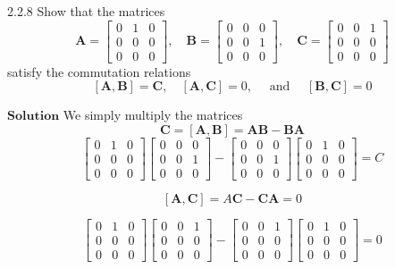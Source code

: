 \begin{mybox}{2.2.8}
Show that the matrices
$$\mathbf{A}=\begin{bmatrix}{0} & {1} & {0} \\ {0} & {0} & {0} \\ {0} & {0} & {0}\end{bmatrix}, \quad \mathbf{B}=\begin{bmatrix}{0} & {0} & {0} \\ {0} & {0} & {1} \\ {0} & {0} & {0}\end{bmatrix}, \quad \mathbf{C}=\begin{bmatrix}{0} & {0} & {1} \\ {0} & {0} & {0} \\ {0} & {0} & {0}\end{bmatrix}$$
satisfy the commutation relations
$$
[\mathbf{A}, \mathbf{B}]=\mathbf{C}, \quad[\mathbf{A}, \mathbf{C}]=0, \quad \text { and } \quad[\mathbf{B}, \mathbf{C}]=0
$$
\end{mybox}


$\boxed{\textbf{Solution}}$ We simply multiply the matrices
$$\mathbf{C}=[\mathbf{A}, \mathbf{B}] = \mathbf{\mathbf{AB}}- \mathbf{BA}$$
$$\begin{bmatrix}{0} & {1} & {0} \\ {0} & {0} & {0} \\ {0} & {0} & {0}\end{bmatrix} \begin{bmatrix}{0} & {0} & {0} \\ {0} & {0} & {1} \\ {0} & {0} & {0}\end{bmatrix} - \begin{bmatrix}{0} & {0} & {0} \\ {0} & {0} & {1} \\ {0} & {0} & {0}\end{bmatrix}\begin{bmatrix}{0} & {1} & {0} \\ {0} & {0} & {0} \\ {0} & {0} & {0}\end{bmatrix} = C$$

$$[\mathbf{A}, \mathbf{C}] = A\mathbf{C}-\mathbf{C}\mathbf{A} = 0$$

$$\begin{bmatrix}{0} & {1} & {0} \\ {0} & {0} & {0} \\ {0} & {0} & {0}\end{bmatrix} \begin{bmatrix}{0} & {0} & {1} \\ {0} & {0} & {0} \\ {0} & {0} & {0}\end{bmatrix}- \begin{bmatrix}{0} & {0} & {1} \\ {0} & {0} & {0} \\ {0} & {0} & {0}\end{bmatrix}\begin{bmatrix}{0} & {1} & {0} \\ {0} & {0} & {0} \\ {0} & {0} & {0}\end{bmatrix} = 0$$

